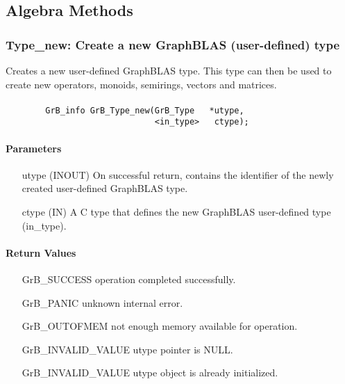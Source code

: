 \subsection{Algebra Methods}
\label{Sec:AlgebraMethods}



\subsubsection{{\sf Type\_new}: Create a new GraphBLAS (user-defined) type}

Creates a new user-defined GraphBLAS type. This type can then be used to create new
operators, monoids, semirings, vectors and matrices.

\paragraph{\syntax}

\begin{verbatim}
        GrB_info GrB_Type_new(GrB_Type	 *utype,
                              <in_type>	  ctype);
\end{verbatim}

\paragraph{Parameters}

\begin{itemize}[leftmargin=1.1in]
    \item[{\sf utype}] ({\sf INOUT}) On successful return, contains the identifier 
                                     of the newly created user-defined GraphBLAS type.
	\item[{\sf ctype}] ({\sf IN})    A C type that defines the new GraphBLAS 
                                     user-defined type ({\sf in\_type}).
\end{itemize}

\paragraph{Return Values}

\begin{itemize}[leftmargin=2.1in]
\item[{\sf GrB\_SUCCESS}]           operation completed successfully.
\item[{\sf GrB\_PANIC}]             unknown internal error.
\item[{\sf GrB\_OUTOFMEM}]          not enough memory available for operation.
\item[{\sf GrB\_INVALID\_VALUE}]    {\sf utype} pointer is {\sf NULL}.
\item[{\sf GrB\_INVALID\_VALUE}]    {\sf utype} object is already initialized.
\end{itemize}

